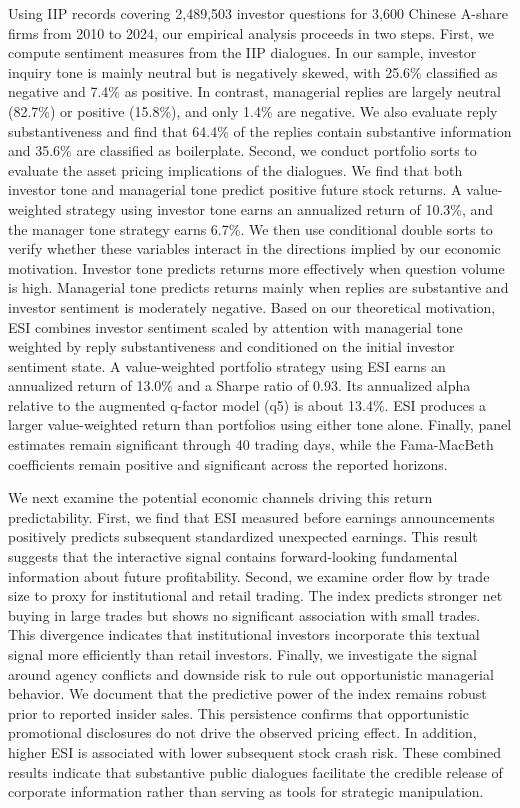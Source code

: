 \documentclass[12pt]{article}
\begin{document}
Using IIP records covering 2,489,503 investor questions for 3,600 Chinese A-share firms from 2010 to 2024, our empirical analysis proceeds in two steps. First, we compute sentiment measures from the IIP dialogues. In our sample, investor inquiry tone is mainly neutral but is negatively skewed, with 25.6\% classified as negative and 7.4\% as positive. In contrast, managerial replies are largely neutral (82.7\%) or positive (15.8\%), and only 1.4\% are negative. We also evaluate reply substantiveness and find that 64.4\% of the replies contain substantive information and 35.6\% are classified as boilerplate. Second, we conduct portfolio sorts to evaluate the asset pricing implications of the dialogues. We find that both investor tone and managerial tone predict positive future stock returns. A value-weighted strategy using investor tone earns an annualized return of 10.3\%, and the manager tone strategy earns 6.7\%. We then use conditional double sorts to verify whether these variables interact in the directions implied by our economic motivation. Investor tone predicts returns more effectively when question volume is high. Managerial tone predicts returns mainly when replies are substantive and investor sentiment is moderately negative. Based on our theoretical motivation, ESI combines investor sentiment scaled by attention with managerial tone weighted by reply substantiveness and conditioned on the initial investor sentiment state. A value-weighted portfolio strategy using ESI earns an annualized return of 13.0\% and a Sharpe ratio of 0.93. Its annualized alpha relative to the augmented q-factor model (q5) is about 13.4\%. ESI produces a larger value-weighted return than portfolios using either tone alone. Finally, panel estimates remain significant through 40 trading days, while the Fama-MacBeth coefficients remain positive and significant across the reported horizons.

We next examine the potential economic channels driving this return predictability. First, we find that ESI measured before earnings announcements positively predicts subsequent standardized unexpected earnings. This result suggests that the interactive signal contains forward-looking fundamental information about future profitability. Second, we examine order flow by trade size to proxy for institutional and retail trading. The index predicts stronger net buying in large trades but shows no significant association with small trades. This divergence indicates that institutional investors incorporate this textual signal more efficiently than retail investors. Finally, we investigate the signal around agency conflicts and downside risk to rule out opportunistic managerial behavior. We document that the predictive power of the index remains robust prior to reported insider sales. This persistence confirms that opportunistic promotional disclosures do not drive the observed pricing effect. In addition, higher ESI is associated with lower subsequent stock crash risk. These combined results indicate that substantive public dialogues facilitate the credible release of corporate information rather than serving as tools for strategic manipulation.
\end{document}
